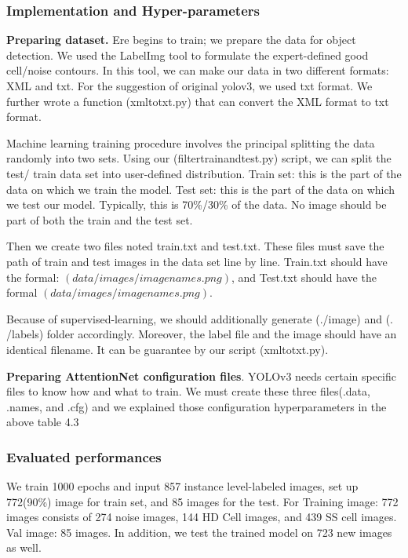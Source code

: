 \subsubsection{Implementation and Hyper-parameters}

\textbf{Preparing dataset.}  Ere begins to train; we prepare the data for object detection. We used the LabelImg tool to formulate the expert-defined good cell/noise contours. In this tool, we can make our data in two different formats: XML and txt. For the suggestion of original yolov3, we used txt format. We further wrote a function (xmltotxt.py) that can convert the XML format to txt format. 

Machine learning training procedure involves the principal splitting the data randomly into two sets. Using our (filtertrainandtest.py) script, we can split the test/ train data set into user-defined distribution. Train set: this is the part of the data on which we train the model. Test set: this is the part of the data on which we test our model. Typically, this is 70\%/30\% of the data. No image should be part of both the train and the test set.

Then we create two files noted train.txt and test.txt. These files must save the path of train and test images in the data set line by line. Train.txt should have the formal: $(data/images/imagenames.png)$, and Test.txt should have the formal $(data/images/imagenames.png)$.

Because of supervised-learning, we should additionally generate (./image) and (. /labels) folder accordingly. Moreover, the label file and the image should have an identical filename. It can be guarantee by our script (xmltotxt.py).

\textbf{Preparing AttentionNet configuration files}. YOLOv3 needs certain specific files to know how and what to train. We must create these three files(.data, .names, and .cfg) and we explained those configuration hyperparameters in the above table 4.3\\



\subsubsection{Evaluated performances}
We train 1000 epochs and input 857 instance level-labeled images, set up 772(90\%) image for train set, and 85 images for the test. For Training image: 772 images consists of 274 noise images, 144 HD Cell images, and 439 SS cell images. Val image: 85 images. In addition, we test the trained model on 723 new images as well.


